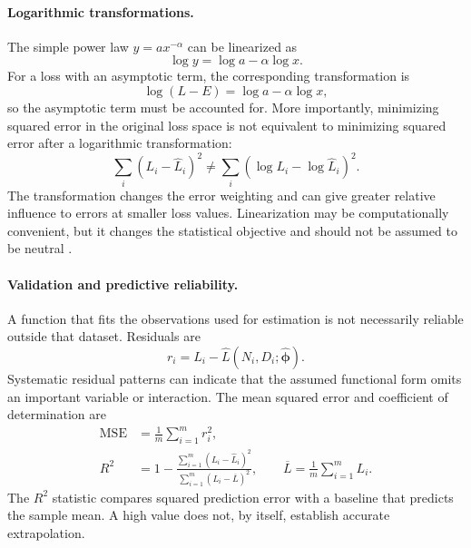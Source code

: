 \paragraph{Logarithmic transformations.}
The simple power law \(y=ax^{-\alpha}\) can be linearized as
\begin{equation}
    \log y=\log a-\alpha\log x.
    \label{eq:scaling-log-linear-simple}
\end{equation}
For a loss with an asymptotic term, the corresponding transformation is
\[
    \log(L-E)=\log a-\alpha\log x,
\]
so the asymptotic term must be accounted for. More importantly, minimizing
squared error in the original loss space is not equivalent to minimizing
squared error after a logarithmic transformation:
\begin{equation}
    \sum_i(L_i-\widehat{L}_i)^2
    \neq
    \sum_i(\log L_i-\log\widehat{L}_i)^2.
    \label{eq:scaling-log-objective-difference}
\end{equation}
The transformation changes the error weighting and can give greater
relative influence to errors at smaller loss values. Linearization may be
computationally convenient, but it changes the statistical objective and
should not be assumed to be neutral \parencite{Li2025MisFitting}.

\paragraph{Validation and predictive reliability.}
A function that fits the observations used for estimation is not necessarily
reliable outside that dataset. Residuals are
\begin{equation}
    r_i=L_i-\widehat{L}(N_i,D_i;\widehat{\boldsymbol{\phi}}).
    \label{eq:scaling-residuals}
\end{equation}
Systematic residual patterns can indicate that the assumed functional form
omits an important variable or interaction. The mean squared error and
coefficient of determination are
\begin{align}
    \operatorname{MSE}
    &=
    \frac{1}{m}\sum_{i=1}^{m}r_i^2,
    \label{eq:scaling-validation-mse}\\
    R^2
    &=
    1-
    \frac{\sum_{i=1}^{m}(L_i-\widehat{L}_i)^2}
         {\sum_{i=1}^{m}(L_i-\overline{L})^2},
    \qquad
    \overline{L}=\frac{1}{m}\sum_{i=1}^{m}L_i.
    \label{eq:scaling-r-squared}
\end{align}
The \(R^2\) statistic compares squared prediction error with a baseline that
predicts the sample mean. A high value does not, by itself, establish
accurate extrapolation.

